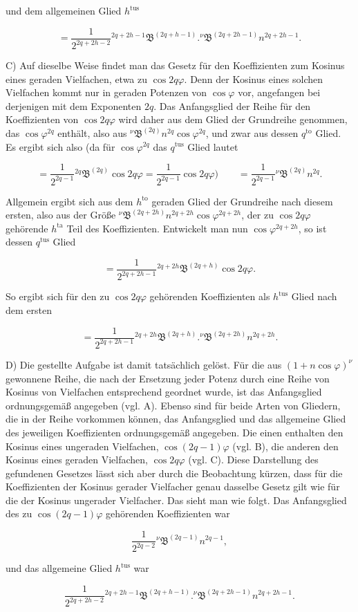 \par\noindent{}%
und dem allgemeinen Glied $h^{\text{tus}}$

\[
= \frac{1}{2^{2q+2h-2}} {}^{2q+2h-1}\mathfrak{B}^{(2q+h-1)}  .  {}^{\nu}\mathfrak{B}^{(2q+2h-1)} n^{2q+2h-1}.
\]

C) Auf dieselbe Weise findet man das Gesetz für den Koeffizienten zum Kosinus eines geraden Vielfachen, etwa zu $\cos 2q\varphi$. Denn der Kosinus eines solchen Vielfachen kommt nur in geraden Potenzen von $\cos\varphi$ vor, angefangen bei derjenigen mit dem Exponenten $2q$. Das Anfangsglied der Reihe für den Koeffizienten von $\cos 2q\varphi$ wird daher aus dem Glied der Grundreihe genommen, das $\cos\varphi^{2q}$ enthält, also aus ${}^{\nu}\mathfrak{B}^{(2q)} n^{2q}\cos\varphi^{2q}$, und zwar aus dessen $q^{\text{to}}$ Glied. Es ergibt sich also (da für $\cos\varphi^{2q}$ das $q^{\text{tus}}$ Glied lautet

\[
= \frac{1}{2^{2q-1}} {}^{2q}\mathfrak{B}^{(2q)} \cos 2q\varphi = \frac{1}{2^{2q-1}} \cos 2q\varphi) \qquad = \frac{1}{2^{2q-1}} {}^{\nu}\mathfrak{B}^{(2q)} n^{2q}.
\]

\noindent Allgemein ergibt sich aus dem $h^{\text{to}}$ geraden Glied der Grundreihe nach diesem ersten, also aus der Größe ${}^{\nu}\mathfrak{B}^{(2q+2h)} n^{2q+2h} \cos\varphi^{2q+2h}$, der zu $\cos 2q\varphi$ gehörende $h^{\text{ta}}$ Teil des Koeffizienten. Entwickelt man nun $\cos\varphi^{2q+2h}$, so ist dessen $q^{\text{tus}}$ Glied

\[
= \frac{1}{2^{2q+2h-1}} {}^{2q+2h}\mathfrak{B}^{(2q+h)} \cos 2q\varphi.
\]

\noindent So ergibt sich für den zu $\cos 2q\varphi$ gehörenden Koeffizienten als $h^{\text{tus}}$ Glied nach dem ersten

\[
= \frac{1}{2^{2q+2h-1}} {}^{2q+2h}\mathfrak{B}^{(2q+h)}  .  {}^{\nu}\mathfrak{B}^{(2q+2h)} n^{2q+2h}.
\]

D) Die gestellte Aufgabe ist damit tatsächlich gelöst. Für die aus $(1+n\cos\varphi)^{\nu}$ gewonnene Reihe, die nach der Ersetzung jeder Potenz durch eine Reihe von Kosinus von Vielfachen entsprechend geordnet wurde, ist das Anfangsglied ordnungsgemäß angegeben (vgl. A). Ebenso sind für beide Arten von Gliedern, die in der Reihe vorkommen können, das Anfangsglied und das allgemeine Glied des jeweiligen Koeffizienten ordnungsgemäß angegeben. Die einen enthalten den Kosinus eines ungeraden Vielfachen, $\cos(2q-1)\varphi$ (vgl. B), die anderen den Kosinus eines geraden Vielfachen, $\cos 2q\varphi$ (vgl. C). Diese Darstellung des gefundenen Gesetzes lässt sich aber durch die Beobachtung kürzen, dass für die Koeffizienten der Kosinus gerader Vielfacher genau dasselbe Gesetz gilt wie für die der Kosinus ungerader Vielfacher. Das sieht man wie folgt. Das Anfangsglied des zu $\cos(2q-1)\varphi$ gehörenden Koeffizienten war

\[
\frac{1}{2^{2q-2}} {}^{\nu}\mathfrak{B}^{(2q-1)} n^{2q-1},
\]

\noindent und das allgemeine Glied $h^{\text{tus}}$ war

\[
\frac{1}{2^{2q+2h-2}} {}^{2q+2h-1}\mathfrak{B}^{(2q+h-1)}  .  {}^{\nu}\mathfrak{B}^{(2q+2h-1)} n^{2q+2h-1}.
\]

